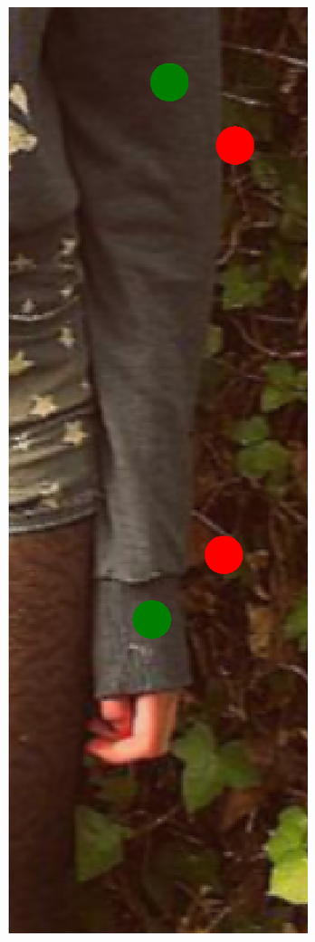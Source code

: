 \begin{figure}[!t]
    \newcommand{\fh}{0.24\columnwidth}
    \centering
    \includegraphics[height=\fh]{resources/Fixing/fix_1}

\end{figure}
